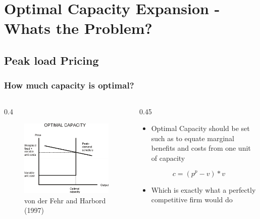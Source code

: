 \section{Optimal Capacity Expansion - Whats the Problem?}

\subsection{Peak load Pricing}

\begin{frame}
\frametitle{How much capacity is optimal?}
\begin{columns}
\begin{column} {0.4\textwidth}

\begin{figure}[h]
\centering
\includegraphics[width=1.\textwidth]{capacity/peak_load_opt}
    \caption{von der Fehr and Harbord (1997)}
    \label{fig:Daten 2004}            
\end{figure}
\end{column}

\begin{column} {0.45\textwidth}
\begin{itemize}
\item Optimal Capacity should be set such as to equate marginal benefits and costs from one unit of capacity
\end {itemize}
  
\begin{equation}
	c=(p^p-v)*v
\end{equation}

\begin{itemize}
\item Which is exactly what a perfectly competitive firm would do
\end {itemize}

\end{column}
\end{columns}
	

\end{frame}